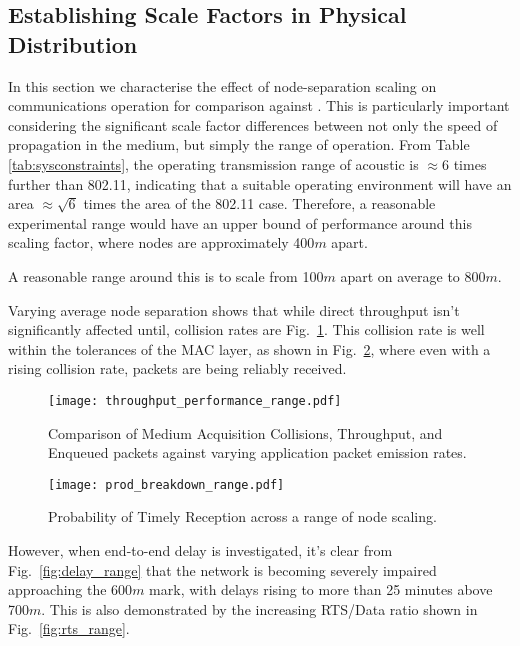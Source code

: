 \subsection{Establishing Scale Factors in Physical Distribution}

In this section we characterise the effect of node-separation scaling on communications operation for comparison against \cite{Guo11}. This is particularly important considering the significant scale factor differences between not only the speed of propagation in the medium, but simply the range of operation. 
From Table \ref{tab:sysconstraints}, the operating transmission range of acoustic is $\approx 6$ times further than 802.11, indicating that a suitable operating environment will have an area $\approx \sqrt{6}$ times the area of the 802.11 case. Therefore, a reasonable experimental range would have an upper bound of performance around this scaling factor, where nodes are approximately 400$m$ apart. 

A reasonable range around this is to scale from 100$m$ apart on average to 800$m$.

Varying average node separation shows that while direct throughput isn't significantly affected until, collision rates are Fig.~\ref{fig:throughput_performance_range}.
This collision rate is well within the tolerances of the MAC layer, as shown in Fig.~\ref{fig:prod_breakdown_range}, where even with a rising collision rate, packets are being reliably received.

\begin{figure}[H]
  \centering
  \texttt{[image: throughput\_performance\_range.pdf]}
  \caption{Comparison of Medium Acquisition Collisions, Throughput, and Enqueued packets against varying application packet emission rates.}
  \label{fig:throughput_performance_range}
\end{figure}

\begin{figure}[H]
  \centering
  \texttt{[image: prod\_breakdown\_range.pdf]}
  \caption{Probability of Timely Reception across a range of node scaling.}
  \label{fig:prod_breakdown_range}
\end{figure}

However, when end-to-end delay is investigated, it's clear from Fig.~\ref{fig:delay_range} that the network is becoming severely impaired approaching the 600$m$ mark, with delays rising to more than 25 minutes above 700$m$.
This is also demonstrated by the increasing RTS/Data ratio shown in Fig.~\ref{fig:rts_range}.

